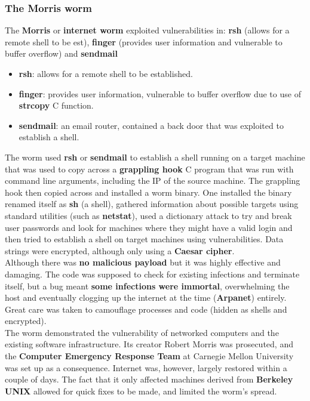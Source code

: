 \documentclass{article}
\newcommand{\np}{\vspace{8pt} \\}
\begin{document}
\subsubsection{The Morris worm}
The \textbf{Morris} or \textbf{internet worm} exploited vulnerabilities in: \textbf{rsh} (allows for a remote shell to be est), \textbf{finger} (provides user information and vulnerable to buffer overflow) and \textbf{sendmail}
\begin{itemize}
	\item \textbf{rsh}: allows for a remote shell to be established.
	\item \textbf{finger}: provides user information, vulnerable to buffer overflow due to use of \textbf{strcopy} C function.
	\item \textbf{sendmail}: an email router, contained a back door that was exploited to establish a shell.
\end{itemize}
The worm used \textbf{rsh} or \textbf{sendmail} to establish a shell running on a target machine that was used to copy across a \textbf{grappling hook} C program that was run with command line arguments, including the IP of the source machine. The grappling hook then copied across and installed a worm binary. One installed the binary renamed itself as \textbf{sh} (a shell), gathered information about possible targets using standard utilities (such as \textbf{netstat}), used a dictionary attack to try and break user passwords and look for machines where they might have a valid login and then tried to establish a shell on target machines using vulnerabilities. Data strings were encrypted, although only using a \textbf{Caesar cipher}.
\pagebreak
\\
Although there was \textbf{no malicious payload} but it was highly effective and damaging. The code was supposed to check for existing infections and terminate itself, but a bug meant \textbf{some infections were immortal}, overwhelming the host and eventually clogging up the internet at the time (\textbf{Arpanet}) entirely. Great care was taken to camouflage processes and code (hidden as shells and encrypted). \np
The worm demonstrated the vulnerability of networked computers and the existing software infrastructure. Its creator Robert Morris was prosecuted, and the \textbf{Computer Emergency Response Team} at Carnegie Mellon University was set up as a consequence. Internet was, however, largely restored within a couple of days. The fact that it only affected machines derived from \textbf{Berkeley UNIX} allowed for quick fixes to be made, and limited the worm's spread.
\end{document}
